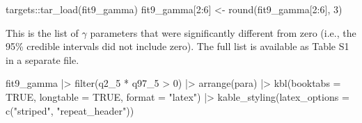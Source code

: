 \documentclass[
  11pt,
  letterpaper,
  DIV=11,
  numbers=noendperiod]{scrartcl}
\newenvironment{Shaded}{}{}
\newcommand{\AttributeTok}[1]{\textcolor[rgb]{0.84,0.23,0.29}{#1}}
\newcommand{\ConstantTok}[1]{\textcolor[rgb]{0.00,0.36,0.77}{#1}}
\newcommand{\DecValTok}[1]{\textcolor[rgb]{0.00,0.36,0.77}{#1}}
\newcommand{\FunctionTok}[1]{\textcolor[rgb]{0.44,0.26,0.76}{#1}}
\newcommand{\NormalTok}[1]{\textcolor[rgb]{0.14,0.16,0.18}{#1}}
\newcommand{\OtherTok}[1]{\textcolor[rgb]{0.44,0.26,0.76}{#1}}
\newcommand{\SpecialCharTok}[1]{\textcolor[rgb]{0.00,0.36,0.77}{#1}}
\newcommand{\StringTok}[1]{\textcolor[rgb]{0.01,0.18,0.38}{#1}}
\begin{document}
\begin{Shaded}
\begin{Highlighting}[]
\NormalTok{targets}\SpecialCharTok{::}\FunctionTok{tar\_load}\NormalTok{(fit9\_gamma)}
\NormalTok{fit9\_gamma[}\DecValTok{2}\SpecialCharTok{:}\DecValTok{6}\NormalTok{] }\OtherTok{\textless{}{-}} \FunctionTok{round}\NormalTok{(fit9\_gamma[}\DecValTok{2}\SpecialCharTok{:}\DecValTok{6}\NormalTok{], }\DecValTok{3}\NormalTok{)}
\end{Highlighting}
\end{Shaded}

This is the list of \(\gamma\) parameters that were significantly
different from zero (i.e., the 95\% credible intervals did not include
zero). The full list is available as Table S1 in a separate file.

\begin{Shaded}
\begin{Highlighting}[]
\NormalTok{fit9\_gamma }\SpecialCharTok{|\textgreater{}}
  \FunctionTok{filter}\NormalTok{(q2\_5 }\SpecialCharTok{*}\NormalTok{ q97\_5 }\SpecialCharTok{\textgreater{}} \DecValTok{0}\NormalTok{) }\SpecialCharTok{|\textgreater{}}
  \FunctionTok{arrange}\NormalTok{(para) }\SpecialCharTok{|\textgreater{}}
  \FunctionTok{kbl}\NormalTok{(}\AttributeTok{booktabs =} \ConstantTok{TRUE}\NormalTok{, }\AttributeTok{longtable =} \ConstantTok{TRUE}\NormalTok{, }\AttributeTok{format =} \StringTok{"latex"}\NormalTok{) }\SpecialCharTok{|\textgreater{}}
  \FunctionTok{kable\_styling}\NormalTok{(}\AttributeTok{latex\_options =} \FunctionTok{c}\NormalTok{(}\StringTok{"striped"}\NormalTok{, }\StringTok{"repeat\_header"}\NormalTok{))}
\end{Highlighting}
\end{Shaded}
\end{document}
